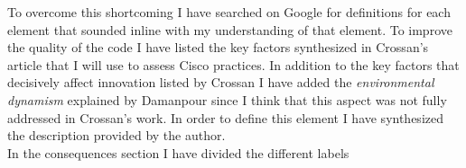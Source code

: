 To overcome this shortcoming I have searched on Google for definitions for each element that sounded inline with my understanding of that element. To improve the quality of the code I have listed the key factors synthesized in Crossan's article \citep{crossan2010} that I will use to assess Cisco practices.
In addition to the key factors that decisively affect innovation listed by Crossan I have added the \textit{environmental dynamism} explained by Damanpour \citep{damanpour1998} since I think that this aspect was not fully addressed in Crossan's work. In order to define this element I have synthesized the description provided by the author.
\\ %
In the consequences section I have divided the different labels
\\ %
